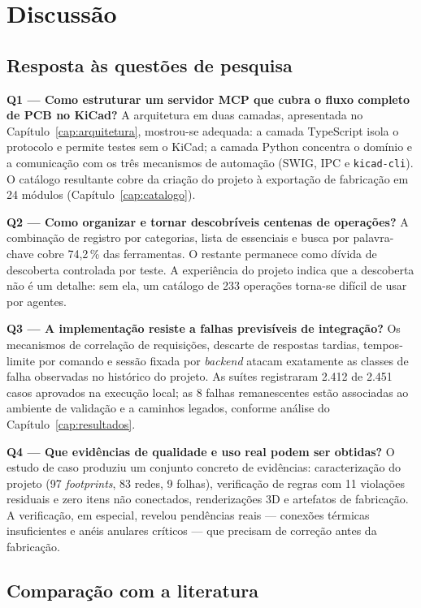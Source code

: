 \chapter{Discussão}\label{cap:discussao}

\section{Resposta às questões de pesquisa}

\textbf{Q1 --- Como estruturar um servidor MCP que cubra o fluxo completo de
PCB no KiCad?} A arquitetura em duas camadas, apresentada no
Capítulo~\ref{cap:arquitetura}, mostrou-se adequada: a camada TypeScript isola
o protocolo e permite testes sem o KiCad; a camada Python concentra o domínio
e a comunicação com os três mecanismos de automação (SWIG, IPC e
\texttt{kicad-cli}). O catálogo resultante cobre da criação do projeto à
exportação de fabricação em 24 módulos (Capítulo~\ref{cap:catalogo}).

\textbf{Q2 --- Como organizar e tornar descobríveis centenas de operações?} A
combinação de registro por categorias, lista de essenciais e busca por
palavra-chave cobre 74,2\,\% das ferramentas. O restante permanece como dívida
de descoberta controlada por teste. A experiência do projeto indica que a
descoberta não é um detalhe: sem ela, um catálogo de 233 operações torna-se
difícil de usar por agentes.

\textbf{Q3 --- A implementação resiste a falhas previsíveis de integração?} Os
mecanismos de correlação de requisições, descarte de respostas tardias,
tempos-limite por comando e sessão fixada por \emph{backend} atacam
exatamente as classes de falha observadas no histórico do projeto. As suítes
registraram 2.412 de 2.451 casos aprovados na execução local; as 8 falhas
remanescentes estão associadas ao ambiente de validação e a caminhos legados,
conforme análise do Capítulo~\ref{cap:resultados}.

\textbf{Q4 --- Que evidências de qualidade e uso real podem ser obtidas?} O
estudo de caso produziu um conjunto concreto de evidências: caracterização do
projeto (97 \emph{footprints}, 83 redes, 9 folhas), verificação de regras com
11 violações residuais e zero itens não conectados, renderizações 3D e
artefatos de fabricação. A verificação, em especial, revelou pendências reais
--- conexões térmicas insuficientes e anéis anulares críticos --- que
precisam de correção antes da fabricação.

\section{Comparação com a literatura}

